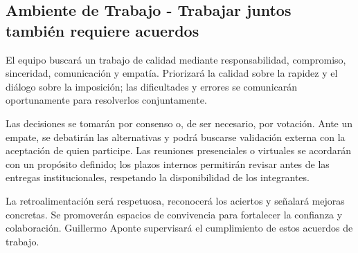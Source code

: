 \subsection{Ambiente de Trabajo - Trabajar juntos también requiere acuerdos}\label{sec:spmp-12-1}

El equipo buscará un trabajo de calidad mediante responsabilidad, compromiso, sinceridad, comunicación y empatía. Priorizará la calidad sobre la rapidez y el diálogo sobre la imposición; las dificultades y errores se comunicarán oportunamente para resolverlos conjuntamente.

Las decisiones se tomarán por consenso o, de ser necesario, por votación. Ante un empate, se debatirán las alternativas y podrá buscarse validación externa con la aceptación de quien participe. Las reuniones presenciales o virtuales se acordarán con un propósito definido; los plazos internos permitirán revisar antes de las entregas institucionales, respetando la disponibilidad de los integrantes.

La retroalimentación será respetuosa, reconocerá los aciertos y señalará mejoras concretas. Se promoverán espacios de convivencia para fortalecer la confianza y colaboración. Guillermo Aponte supervisará el cumplimiento de estos acuerdos de trabajo.
